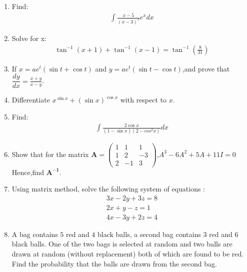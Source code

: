\documentclass[12pt,-letter paper]{article}
\providecommand{\brak}[1]{\ensuremath{\left(#1\right)}}
\theoremstyle{remark}
\newcommand{\myvec}[1]{\ensuremath{\begin{pmatrix}#1\end{pmatrix}}}
\let\vec\mathbf
\begin{document}
\begin{enumerate}
 \item Find: 
 \begin{align*}
 \int{\frac{x-5}{\brak{x-3}^3}}e^x dx
 \end{align*}
  
\item Solve for x:
\begin{align*}
\tan^{-1}\brak{x+1}+\tan^{-1}\brak{x-1}=\tan^{-1}\brak{\frac{8}{31}}
\end{align*}

\item If ${x}=ae^t\brak{\sin{t}+\cos{t}}$ and ${y}=ae^t\brak{\sin{t}-\cos{t}}$,and prove that $\dfrac{dy}{dx}=\frac{x+y}{x-y}$.

\item Differentiate $x^{\sin x}+\brak{\sin x}^{\cos x}$ with respect to $x$.

\item Find: 
\begin{align*}
\int{\frac{2\cos x}{\brak{1-\sin x}\brak{2-cos^2 x}}}dx
\end{align*}  

\item Show that for the matrix $\vec{A}=\myvec{1&1&1 \\ 1&2&-3 \\ 2&-1&3}$,${A}^3-6{A}^2+5{A}+11{I}=0$
Hence,find $\vec{A^{-1}}$.

\item Using matrix method, solve the following system of equations :
\begin{align*}
    {3x-2y+3z}=8 \\
    {2x+y-z}=1 \\
    {4x-3y+2z}=4
\end{align*}

\item A bag contains $5$ red and $4$ black balls, a second bag contains $3$ red and $6$ black balls. One of the two bags is selected at random and two balls are drawn at random (without replacement) both of which are found to be red. Find the probability that the balls are drawn from the second bag.
\end{enumerate}
    
\end{document}
